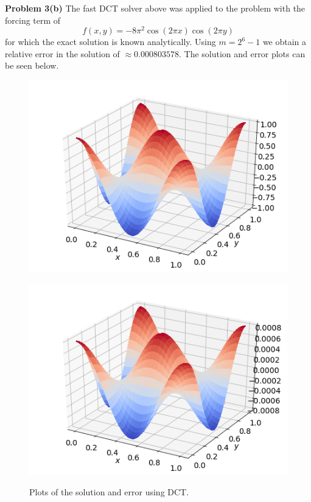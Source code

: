 \documentclass[12pt]{article}
\newcommand{\problem}[1]{\hspace{-4 ex} \large \textbf{Problem #1} }
\begin{document}
\bigbreak
\problem{3(b)} The fast DCT solver above was applied to the problem with the forcing term of 
$$
f(x,y) = -8\pi^2 \cos(2\pi x )\cos(2\pi y )
$$
for which the exact solution is known analytically. Using $m=2^6-1$ we obtain a relative error in the solution of $\approx 0.000803578$. The solution and error plots can be seen below.
\begin{figure}[H]
	\centering
	\caption{Plots of the solution and error using DCT.}
	\begin{minipage}{.5\textwidth}
		\centering
		\includegraphics[width=1\linewidth]{hw4_p3_plot}
		\label{fig:test1}
	\end{minipage}%
	\begin{minipage}{.5\textwidth}
		\centering
		\includegraphics[width=1\linewidth]{hw4_p3_error}
		\label{fig:test2}
	\end{minipage}
\end{figure}
\end{document}
